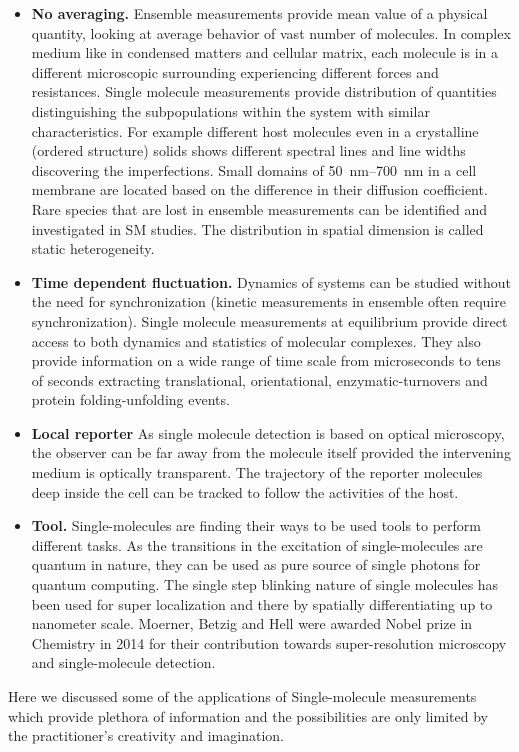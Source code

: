 \begin{itemize}
	\item \textbf{No averaging.} Ensemble measurements provide mean value of a physical quantity, looking at average behavior of vast number of molecules.
	In complex medium like in condensed matters and cellular matrix, each molecule is in a different microscopic surrounding experiencing different forces and resistances.
	Single molecule measurements provide distribution of quantities distinguishing the subpopulations within the system with similar characteristics.
	For example different host molecules even in a crystalline (ordered structure) solids shows different spectral lines and line widths discovering the imperfections.\cite{kozankiewicz1994single,reilly1993spectral}
	Small domains of \SIrange{50}{700}{\nm} in a cell membrane are located based on the difference in their diffusion coefficient.\cite{lommerse2004singlemolecule}
	Rare species that are lost in ensemble measurements can be identified and investigated in SM studies.
	The distribution in spatial dimension is called static heterogeneity.
	\item \textbf{Time dependent fluctuation.} Dynamics of systems can be studied without the need for synchronization (kinetic measurements in ensemble often require synchronization).
	Single molecule measurements at equilibrium provide direct access to both dynamics and statistics of molecular complexes.
	They also provide information on a wide range of time scale from microseconds to tens of seconds extracting translational, orientational, enzymatic-turnovers and protein folding-unfolding events.
	\item \textbf{Local reporter} As single molecule detection is based on optical microscopy, the observer can be far away from the molecule itself provided the intervening medium is optically transparent.
	The trajectory of the reporter molecules deep inside the cell can be tracked to follow the activities of the host.
	\item \textbf{Tool.} Single-molecules are finding their ways to be used tools to perform different tasks.
	As the transitions in the excitation of single-molecules are quantum in nature, they can be used as pure source of single photons for quantum computing.
	The single step blinking nature of single molecules has been used for super localization and there by spatially differentiating up to nanometer scale.
	Moerner, Betzig and Hell were awarded Nobel prize in Chemistry in 2014 for their contribution towards super-resolution microscopy and single-molecule detection.
\end{itemize}
Here we discussed some of the applications of Single-molecule measurements which provide plethora of information and the possibilities are only limited by the practitioner's creativity and imagination.

